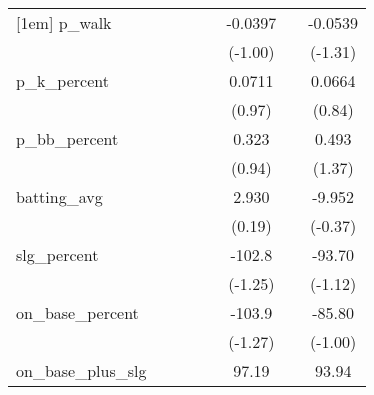 {\begin{tabular}{l*{7}{c}}
[1em]
p\_walk      &                     &                     &                     &                     &     -0.0397         &                     &     -0.0539         \\
            &                     &                     &                     &                     &     (-1.00)         &                     &     (-1.31)         \\
[1em]
p\_k\_percent &                     &                     &                     &                     &      0.0711         &                     &      0.0664         \\
            &                     &                     &                     &                     &      (0.97)         &                     &      (0.84)         \\
[1em]
p\_bb\_percent&                     &                     &                     &                     &       0.323         &                     &       0.493         \\
            &                     &                     &                     &                     &      (0.94)         &                     &      (1.37)         \\
[1em]
batting\_avg &                     &                     &                     &                     &       2.930         &                     &      -9.952         \\
            &                     &                     &                     &                     &      (0.19)         &                     &     (-0.37)         \\
[1em]
slg\_percent &                     &                     &                     &                     &      -102.8         &                     &      -93.70         \\
            &                     &                     &                     &                     &     (-1.25)         &                     &     (-1.12)         \\
[1em]
on\_base\_percent&                     &                     &                     &                     &      -103.9         &                     &      -85.80         \\
            &                     &                     &                     &                     &     (-1.27)         &                     &     (-1.00)         \\
[1em]
on\_base\_plus\_slg&                     &                     &                     &                     &       97.19         &                     &       93.94         \\

\end{tabular}}

